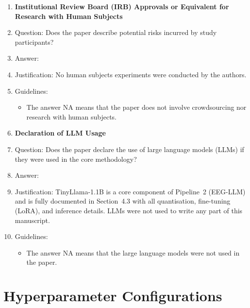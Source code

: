 \documentclass{article}
\begin{document}
\begin{enumerate}
\item {\bf Institutional Review Board (IRB) Approvals or Equivalent for Research with Human Subjects}
    \item[] Question: Does the paper describe potential risks incurred by study participants?
    \item[] Answer: \answerNA{}
    \item[] Justification: No human subjects experiments were conducted by the authors.
    \item[] Guidelines:
    \begin{itemize}
        \item The answer NA means that the paper does not involve crowdsourcing nor research with human subjects.
    \end{itemize}

\item {\bf Declaration of LLM Usage}
    \item[] Question: Does the paper declare the use of large language models (LLMs) if they were used in the core methodology?
    \item[] Answer: \answerYes{}
    \item[] Justification: TinyLlama-1.1B is a core component of Pipeline~2 (EEG-LLM) and is fully documented in Section~4.3 with all quantisation, fine-tuning (LoRA), and inference details. LLMs were not used to write any part of this manuscript.
    \item[] Guidelines:
    \begin{itemize}
        \item The answer NA means that the large language models were not used in the paper.
    \end{itemize}

\end{enumerate}

\appendix

\section{Hyperparameter Configurations}
\label{app:hyperparams}
\end{document}
